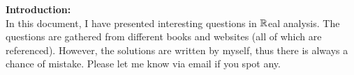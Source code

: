 \documentclass[10pt]{article}
\begin{document}





\begin{center}
\textbf{Introduction:}\\
In this document, I have presented interesting questions in $\mathbb{R}$eal analysis. The questions are gathered from different books and websites (all of which are referenced). However, the solutions are written by myself, thus there is always a chance of mistake. Please let me know via email if you spot any.
\end{center}
\tableofcontents



\newpage


\end{document}
